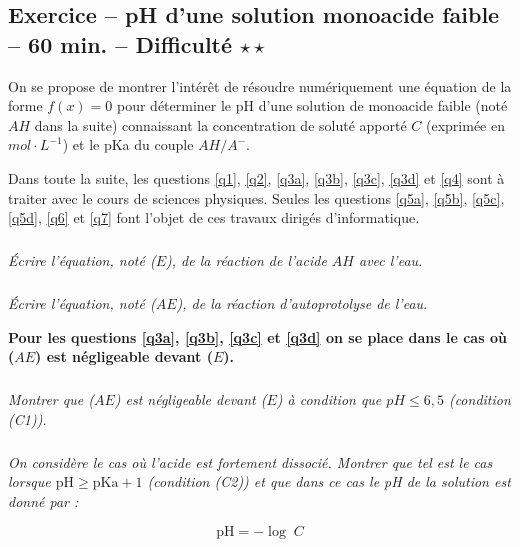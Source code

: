 \documentclass[10pt,fleqn]{article} %
\begin{document}

\vspace{5cm}
\pagestyle{fancy}
\thispagestyle{plain}


\def\columnseprulecolor{\color{ocre}}
\setlength{\columnseprule}{0.4pt} 
\begin{multicols}{2}



\subsection*{Exercice -- pH d'une solution monoacide faible -- 60 min. -- Difficulté $\star\star$}

On se propose de montrer l’intérêt de résoudre numériquement une équation de la forme $f(x) = 0$ 
pour déterminer le pH d’une solution de monoacide faible (noté $AH$ dans la suite) connaissant la 
concentration de soluté apporté $C$ (exprimée en  $mol\cdot L^{-1}$) et le pKa du couple  $AH/A^-$. 
\begin{rem}
Dans toute la suite, les questions \ref{q1}, \ref{q2}, \ref{q3a}, \ref{q3b}, \ref{q3c}, \ref{q3d} et \ref{q4}
sont à traiter avec le cours de sciences physiques. Seules les questions \ref{q5a}, \ref{q5b}, \ref{q5c}, \ref{q5d}, \ref{q6} et \ref{q7} font l’objet de ces travaux dirigés d’informatique. 
\end{rem}

\subparagraph{\label{q1}}
\textit{Écrire l’équation, noté ($E$), de la réaction de l’acide $AH$ avec l’eau.}

\subparagraph{\label{q2}}
\textit{Écrire l’équation, noté ($AE$), de la réaction d’autoprotolyse de l’eau.}

\vspace{.5cm}

\textbf{Pour les questions \ref{q3a}, \ref{q3b}, \ref{q3c} et \ref{q3d} on se place dans le cas où ($AE$) est négligeable devant ($E$).}

\subparagraph{\label{q3a}}
\textit{Montrer que ($AE$) est négligeable devant ($E$) à condition que $pH \leq 6,5$ (condition (C1)).}

\subparagraph{\label{q3b}}
\textit{On considère le cas où l’acide est fortement dissocié. Montrer que tel est le cas lorsque 
$\text{pH} \geq \text{pKa} +1$ (condition (C2)) et que dans ce cas le pH de la solution est donné par : }

\begin{equation} \label{eq1}
\text{pH}= -\log\; C 
\end{equation}



\end{multicols}
\end{document}

